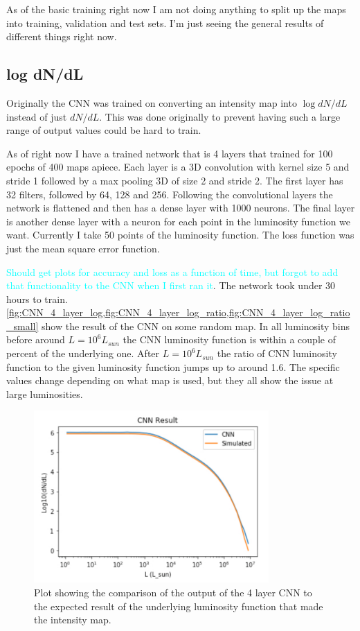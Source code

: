 \documentclass{article}
\newcommand{\dnp}[1]{\textcolor{cyan}{#1}}
\begin{document}
		As of the basic training right now I am not doing anything to split up the maps into training, validation and test sets.  I'm just seeing the general results of different things right now.

		\subsection{log dN/dL} \label{sec:logValue}
			Originally the CNN was trained on converting an intensity map into \(\log dN/dL\) instead of just \(dN/dL\).  This was done originally to prevent having such a large range of output values could be hard to train.

			As of right now I have a trained network that is 4 layers that trained for 100 epochs of 400 maps apiece.  Each layer is a 3D convolution with kernel size 5 and stride 1 followed by a max pooling 3D of size 2 and stride 2.  The first layer has 32 filters, followed by 64, 128 and 256.  Following the convolutional layers the network is flattened and then has a dense layer with 1000 neurons.  The final layer is another dense layer with a neuron for each point in the luminosity function we want.  Currently I take 50 points of the luminosity function.  The loss function was just the mean square error function.

			\dnp{Should get plots for accuracy and loss as a function of time, but forgot to add that functionality to the CNN when I first ran it}.  The network took under 30 hours to train.  \cref{fig:CNN_4_layer_log,fig:CNN_4_layer_log_ratio,fig:CNN_4_layer_log_ratio_small} show the result of the CNN on some random map.  In all luminosity bins before around \(L = 10^6 L_{sun}\) the CNN luminosity function is within a couple of percent of the underlying one.  After \(L = 10^6 L_{sun}\) the ratio of CNN luminosity function to the given luminosity function jumps up to around 1.6.  The specific values change depending on what map is used, but they all show the issue at large luminosities.

			\begin{figure}[H]
				\centering 
				\includegraphics[width=0.8\textwidth]{CNN_4_layer_log.pdf}
				\caption{Plot showing the comparison of the output of the 4 layer CNN to the expected result of the underlying luminosity function that made the intensity map.}
				\label{fig:CNN_4_layer_log}
			\end{figure}
\end{document}
